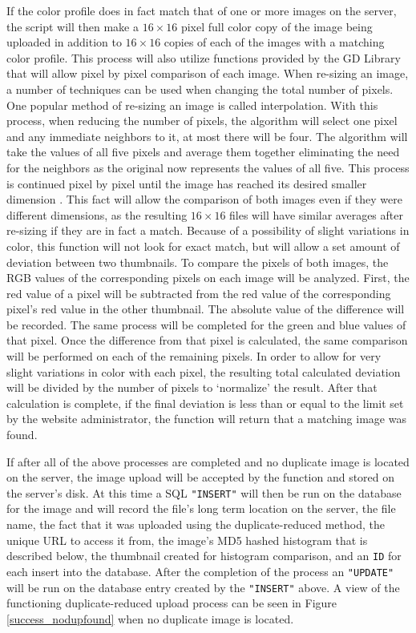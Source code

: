 If the color profile does in fact match that of one or more images on the server, the script will then make a $16\times16$ pixel full color copy of the image being uploaded in addition to $16\times16$ copies of each of the images with a matching color profile. This process will also utilize functions provided by the GD Library that will allow pixel by pixel comparison of each image. When re-sizing an image, a number of techniques can be used when changing the total number of pixels. One popular method of re-sizing an image is called interpolation. With this process, when reducing the number of pixels, the algorithm will select one pixel and any immediate neighbors to it, at most there will be four. The algorithm will take the values of all five pixels and average them together eliminating the need for the neighbors as the original now represents the values of all five. This process is continued pixel by pixel until the image has reached its desired smaller dimension \cite{Acharya:2007}. This fact will allow the comparison of both images even if they were different dimensions, as the resulting $16\times16$ files will have similar averages after re-sizing if they are in fact a match. Because of a possibility of slight variations in color, this function will not look for exact match, but will allow a set amount of deviation between two thumbnails. To compare the pixels of both images, the RGB values of the corresponding pixels on each image will be analyzed. First, the red value of a pixel will be subtracted from the red value of the corresponding pixel's red value in the other thumbnail. The absolute value of the difference will be recorded. The same process will be completed for the green and blue values of that pixel. Once the difference from that pixel is calculated, the same comparison will be performed on each of the remaining pixels. In order to allow for very slight variations in color with each pixel, the resulting total calculated deviation will be divided by the number of pixels to `normalize' the result. After that calculation is complete, if the final deviation is less than or equal to the limit set by the website administrator, the function will return that a matching image was found.

If after all of the above processes are completed and no duplicate image is located on the server, the image upload will be accepted by the function and stored on the server's disk. At this time a SQL {\tt "INSERT"} will then be run on the database for the image and will record the file's long term location on the server, the file name, the fact that it was uploaded using the duplicate-reduced method, the unique URL to access it from, the image's MD5 hashed histogram that is described below, the thumbnail created for histogram comparison, and an {\tt ID} for each insert into the database. After the completion of the process an {\tt "UPDATE"} will be run on the database entry created by the {\tt "INSERT"} above. A view of the functioning duplicate-reduced upload process can be seen in Figure \ref{success_nodupfound} when no duplicate image is located.


